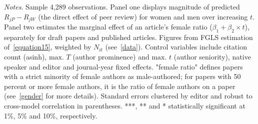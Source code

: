 \begin{table}
\begin{threeparttable}
\begin{tablenotes}
            \item \textit{Notes}. Sample 4,289 observations. Panel one displays magnitude of predicted \(R_{jP}-R_{jW}\) (the direct effect of peer review) for women and men over increasing \(t\). Panel two estimates the marginal effect of an article's female ratio (\(\beta_1+\beta_2\times t\)), separately for draft papers and published articles. Figures from FGLS estimation of~\autoref{equation15}, weighted by \(N_{it}\) (see~\autoref{data}). Control variables include citation count (asinh), \(\text{max. }T\) (author prominence) and \(\text{max. }t\) (author seniority), native speaker and editor and journal-year fixed effects. "female ratio" defines papers with a strict minority of female authors as male-authored; for papers with 50 percent or more female authors, it is the ratio of female authors on a paper (see~\autoref{gender} for more details). Standard errors clustered by editor and robust to cross-model correlation in parentheses. ***, ** and * statistically significant at 1\%, 5\% and 10\%, respectively.
        \end{tablenotes}
    \end{threeparttable}
\end{table}